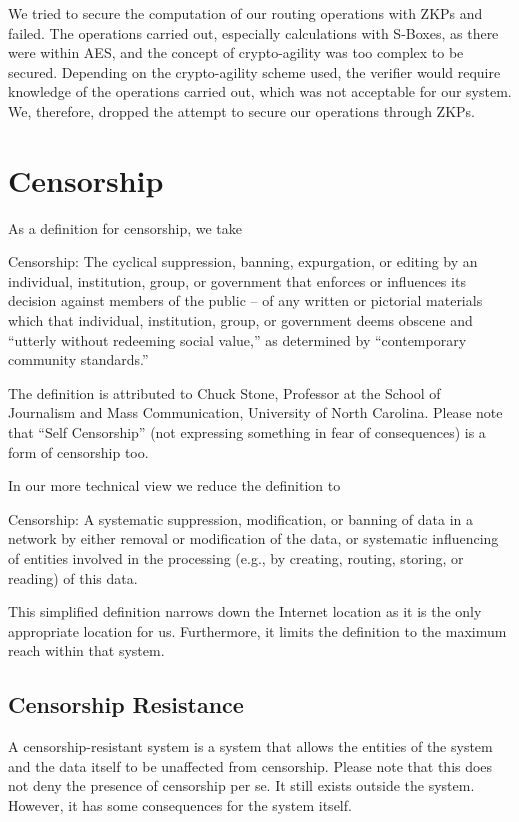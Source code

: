 We tried to secure the computation of our routing operations with ZKPs and failed. The operations carried out, especially calculations with S-Boxes, as there were within AES, and the concept of crypto-agility was too complex to be secured. Depending on the crypto-agility scheme used, the verifier would require knowledge of the operations carried out, which was not acceptable for our system. We, therefore, dropped the attempt to secure our operations through ZKPs.

\section{Censorship}
As a definition for censorship, we take
\begin{shadequote}{}
	Censorship: The cyclical suppression, banning, expurgation, or editing by an individual, institution, group, or government that enforces or influences its decision against members of the public -- of any written or pictorial materials which that individual, institution, group, or government deems obscene and ``utterly without redeeming social value,'' as determined by ``contemporary community standards.''
\end{shadequote}

The definition is attributed to Chuck Stone, Professor at the School of Journalism and Mass Communication, University of North Carolina. Please note that ``Self Censorship'' (not expressing something in fear of consequences) is a form of censorship too.

In our more technical view we reduce the definition to
\begin{shadequote}{}
	Censorship: A systematic suppression, modification, or banning of data in a network by either removal or modification of the data, or systematic influencing of entities involved in the processing (e.g., by creating, routing, storing, or reading) of this data.
\end{shadequote}
This simplified definition narrows down the Internet location as it is the only appropriate location for us. Furthermore, it limits the definition to the maximum reach within that system.

\subsection{Censorship Resistance}
A censorship-resistant system is a system that allows the entities of the system and the data itself to be unaffected from censorship. Please note that this does not deny the presence of censorship per se. It still exists outside the system. However, it has some consequences for the system itself.

